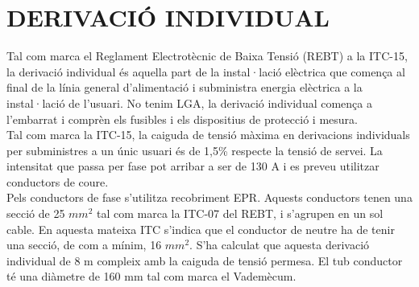 \chapter{\uppercase{Derivació individual}}
Tal com marca el Reglament Electrotècnic de Baixa Tensió (REBT) a la ITC-15, la derivació individual és aquella part de la instal·lació elèctrica que comença al final de la línia general d'alimentació i subministra energia elèctrica a la instal·lació de l'usuari. No tenim LGA, la derivació individual comença a l'embarrat i comprèn els fusibles i els dispositius de protecció i mesura.\\
\newline
 Tal com marca la ITC-15, la caiguda de tensió màxima en derivacions individuals per subministres a un únic usuari és de 1,5\% respecte la tensió de servei. La intensitat que passa per fase pot arribar a ser de 130 A i es preveu utilitzar conductors de coure.\\
\newline Pels conductors de fase s'utilitza recobriment EPR. Aquests conductors tenen una secció de 25 $mm^2$ tal com marca la ITC-07 del REBT, i s'agrupen en un sol cable. En aquesta mateixa ITC s'indica que el conductor de neutre ha de tenir una secció, de com a mínim, 16 $mm^2$. S'ha calculat que aquesta derivació individual de 8 m compleix amb la caiguda de tensió permesa. El tub conductor té una diàmetre de 160 mm tal com marca el Vademècum.




\clearpage